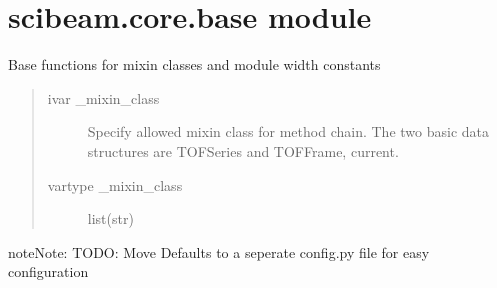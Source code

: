 \documentclass[letterpaper,10pt,english]{sphinxmanual}
\begin{document}
\section{scibeam.core.base module}
\label{\detokenize{scibeam.core:module-scibeam.core.base}}\label{\detokenize{scibeam.core:scibeam-core-base-module}}
Base functions for mixin classes and module width constants
\begin{quote}\begin{description}
\item[{ivar \_mixin\_class}] \leavevmode
Specify allowed mixin class for method chain.
The two basic data structures are TOFSeries and TOFFrame,
current.

\item[{vartype \_mixin\_class}] \leavevmode
list(str)

\end{description}\end{quote}

\begin{sphinxadmonition}{note}{Note:}
TODO: Move Defaults to a seperate config.py file for easy
configuration
\end{sphinxadmonition}
\end{document}
